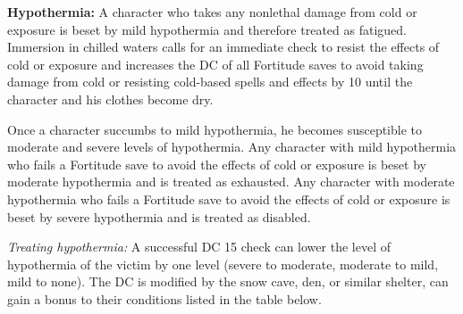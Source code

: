\textbf{Hypothermia:} A character who takes any nonlethal damage from cold or exposure is beset by mild hypothermia and therefore treated as fatigued. Immersion in chilled waters calls for an immediate check to resist the effects of cold or exposure and increases the DC of all Fortitude saves to avoid taking damage from cold or resisting cold-based spells and effects by 10 until the character and his clothes become dry.

Once a character succumbs to mild hypothermia, he becomes susceptible to moderate and severe levels of hypothermia. Any character with mild hypothermia who fails a Fortitude save to avoid the effects of cold or exposure is beset by moderate hypothermia and is treated as exhausted. Any character with moderate hypothermia who fails a Fortitude save to avoid the effects of cold or exposure is beset by severe hypothermia and is treated as disabled.

\textit{Treating hypothermia:} A successful DC 15  check can lower the level of hypothermia of the victim by one level (severe to moderate, moderate to mild, mild to none). The DC is modified by the snow cave, den, or similar shelter, can gain a bonus to their conditions listed in the table below.

